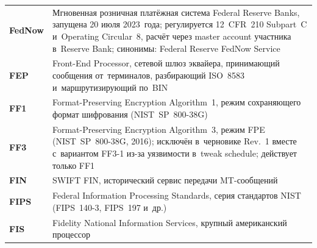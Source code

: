 \begin{longtable}{@{}p{4.5em}p{\dimexpr\linewidth-4.5em-2\tabcolsep\relax}@{}}
  \textbf{FedNow}            & Мгновенная розничная платёжная система Federal Reserve Banks, запущена 20 июля 2023~года; регулируется 12~CFR~210 Subpart~C и~Operating Circular~8, расчёт через master account участника в~Reserve Bank; синонимы: Federal Reserve FedNow Service                                               \\
  \textbf{FEP}               & Front-End Processor, сетевой шлюз эквайера, принимающий сообщения от~терминалов, разбирающий ISO~8583 и~маршрутизирующий по~BIN                                                                                                                                                                    \\
  \textbf{FF1}               & Format-Preserving Encryption Algorithm~1, режим сохраняющего формат шифрования (NIST~SP~800-38G)                                                                                                                                                                                                 \\
  \textbf{FF3}               & Format-Preserving Encryption Algorithm~3, режим FPE (NIST~SP~800-38G, 2016); исключён в~черновике Rev.~1 вместе с~вариантом FF3-1 из-за уязвимости в~tweak schedule; действует только FF1                                                                                                                                                                                        \\
  \textbf{FIN}               & SWIFT FIN, исторический сервис передачи MT-сообщений                                                                                                                                                                                                                                             \\
  \textbf{FIPS}              & Federal Information Processing Standards, серия стандартов NIST (FIPS~140-3, FIPS~197 и~др.)                                                                                                                                                                                                     \\
  \textbf{FIS}               & Fidelity National Information Services, крупный американский процессор                                                                                                                                                                                                                           \\

\end{longtable}
